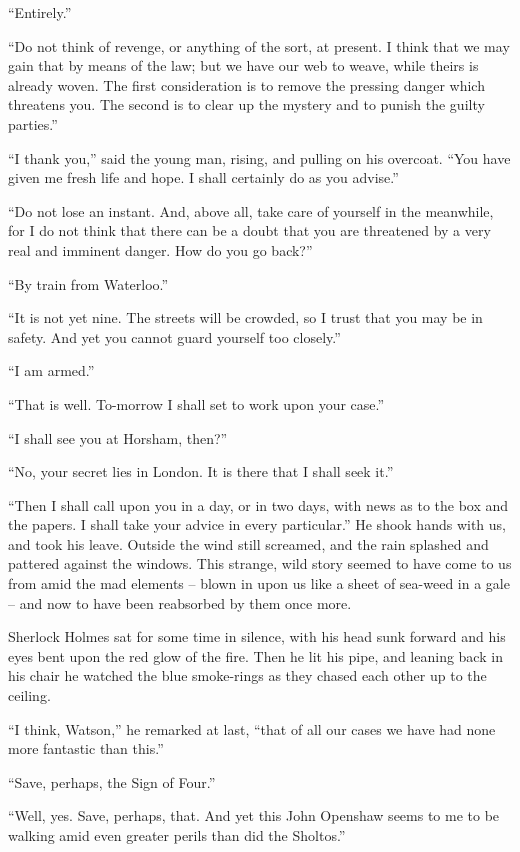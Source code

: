 “Entirely.”

“Do not think of revenge, or anything of the sort, at present.
I think that we may gain that by means of the law; but
we have our web to weave, while theirs is already woven. The
first consideration is to remove the pressing danger which
threatens you. The second is to clear up the mystery and to
punish the guilty parties.”

“I thank you,” said the young man, rising, and pulling on
his overcoat. “You have given me fresh life and hope. I
shall certainly do as you advise.”

“Do not lose an instant. And, above all, take care of yourself
in the meanwhile, for I do not think that there can be a
doubt that you are threatened by a very real and imminent
danger. How do you go back?”

“By train from Waterloo.”

“It is not yet nine. The streets will be crowded, so I trust
that you may be in safety. And yet you cannot guard yourself
too closely.”

“I am armed.”

“That is well. To-morrow I shall set to work upon your
case.”

“I shall see you at Horsham, then?”

“No, your secret lies in London. It is there that I shall
seek it.”

“Then I shall call upon you in a day, or in two days, with
news as to the box and the papers. I shall take your advice
in every particular.” He shook hands with us, and took his
leave. Outside the wind still screamed, and the rain splashed
and pattered against the windows. This strange, wild story
seemed to have come to us from amid the mad elements -- blown
in upon us like a sheet of sea-weed in a gale -- and now
to have been reabsorbed by them once more.

Sherlock Holmes sat for some time in silence, with his head
sunk forward and his eyes bent upon the red glow of the fire.
Then he lit his pipe, and leaning back in his chair he watched
the blue smoke-rings as they chased each other up to the
ceiling.

“I think, Watson,” he remarked at last, “that of all our
cases we have had none more fantastic than this.”

“Save, perhaps, the Sign of Four.”

“Well, yes. Save, perhaps, that. And yet this John
Openshaw seems to me to be walking amid even greater perils than
did the Sholtos.”

